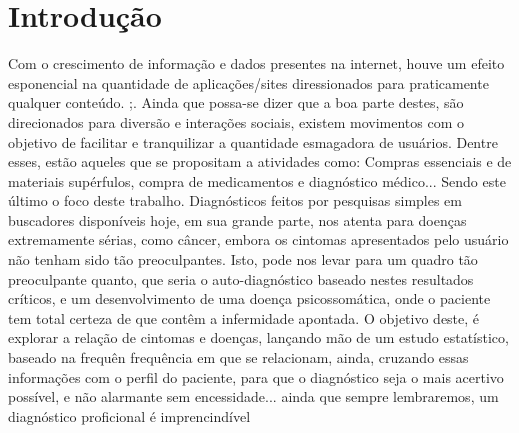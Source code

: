 \section{Introdução}

 Com o crescimento de informação e dados presentes na internet, houve um efeito esponencial na quantidade de aplicações/sites diressionados para praticamente qualquer conteúdo.
;. Ainda que possa-se dizer que a boa parte destes, são direcionados para diversão e interações sociais, existem movimentos com o objetivo de facilitar e tranquilizar a quantidade esmagadora de usuários. Dentre esses, estão aqueles que se propositam a atividades como: Compras essenciais e de materiais supérfulos, compra de medicamentos e  diagnóstico médico...
Sendo este último o foco deste trabalho.
Diagnósticos feitos por pesquisas simples em buscadores disponíveis hoje, em sua grande parte, nos atenta para doenças extremamente sérias, como câncer, embora os cintomas apresentados pelo usuário não tenham sido tão preoculpantes.
Isto, pode nos levar para um quadro tão preoculpante quanto, que seria o auto-diagnóstico baseado nestes resultados críticos, e um desenvolvimento de uma doença psicossomática, onde o paciente tem total certeza de que contêm a infermidade apontada.
O objetivo deste, é explorar a relação de cintomas e doenças, lançando mão de um estudo estatístico, baseado na frequên frequência em que se relacionam, ainda, cruzando essas informações com o perfil do paciente, para que o diagnóstico seja o mais acertivo possível, e não alarmante sem encessidade... ainda que sempre lembraremos, um diagnóstico proficional é imprencindível